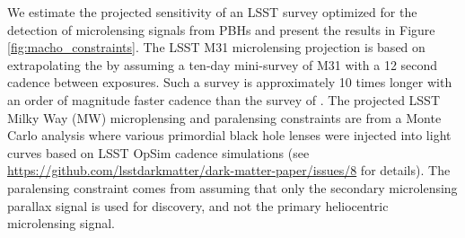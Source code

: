 
We estimate the projected sensitivity of an LSST survey optimized for the detection of microlensing signals from PBHs and present the results in Figure \ref{fig:macho_constraints}.
The LSST M31 microlensing projection is based on extrapolating the \citet{2017arXiv170102151N} by assuming a ten-day mini-survey of M31 with a 12 second cadence between exposures.
Such a survey is approximately 10 times longer with an order of magnitude faster cadence than the survey of \citet{2017arXiv170102151N}.
The projected LSST Milky Way (MW) microplensing and paralensing constraints are from a Monte Carlo analysis where various primordial black hole lenses were injected into light curves based on LSST OpSim cadence simulations (see \url{https://github.com/lsstdarkmatter/dark-matter-paper/issues/8} for details).
The paralensing constraint comes from assuming that only the secondary microlensing parallax signal is used for discovery, and not the primary heliocentric microlensing signal.

\begin{comment}
        The microlensing and paralensing signals for a $23^\mathrm{rd}$ magnitude sourcestar in the bulge being lensed by a $50\,\mathrm{M}_\odot$ black hole. 
        For events with an Einstein crossing time much less than a year (i.e., approximately solar mass and below), the microlensing magnification will appear symmetric in time (orange curve).
        For microlensing events lasting on the order of a year or more (i.e., approximately solar mass and above), the lensing geometry changes as Earth orbits the Sun, leading to a parallax effect.
        This paralensing signal has a period of a year, with the phase determined by the coordinates of the source star, making it robust to other astrophysical systematics.
        It is also possible to detect binary dark matter, and extend the mass range to planet mass compact dark matter, via the source passing through one of the gravitational lensing caustic curves formed by the binary lens.
        The green curve on top of the heliocentric orange curve is representative of a typical planetary microlensing event caused by a caustic crossing.
        While LSST can measure these events if lucky, we will rely on LSST to detect the heliocentric microlensing event and trigger targeted follow-up higher cadence observations to measure the planetary microlensing event.
        The black data points are representative of extending the LSST wide-fast-deep cadence into the Galactic plane. \WAD{Need to update this figure with the LSST WFD cadence.}
        \emph{[Right]}
        A cartoon diagram of paralensing. 
        For microlensing events lasting on the order of a year or more the lensing geometry changes as Earth orbits the Sun, leading to a parallax effect.
        \Contributors{Will D., PALS Collaboration}
\end{comment}



